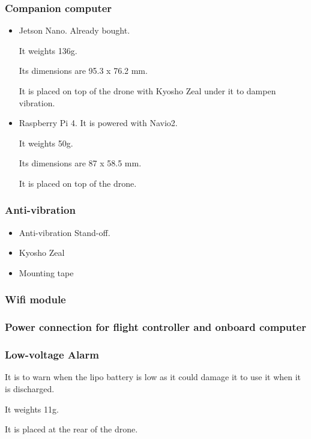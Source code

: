\subsubsection{Companion computer}
\begin{itemize}
    \item Jetson Nano. Already bought.

          It weights 136g.

          Its dimensions are 95.3 x 76.2 mm.

          It is placed on top of the drone with Kyosho Zeal under it to dampen vibration.

    \item Raspberry Pi 4. It is powered with Navio2.

          It weights 50g.

          Its dimensions are 87 x 58.5 mm.

          It is placed on top of the drone.
\end{itemize}

\subsubsection{Anti-vibration}
\begin{itemize}
    \item Anti-vibration Stand-off.

    \item Kyosho Zeal
    \item Mounting tape
\end{itemize}

\subsubsection{Wifi module}

\subsubsection{Power connection for flight controller and onboard computer}

\subsubsection{Low-voltage Alarm}
It is to warn when the lipo battery is low as it could damage it to use it when it is discharged.

It weights 11g.

It is placed at the rear of the drone.

